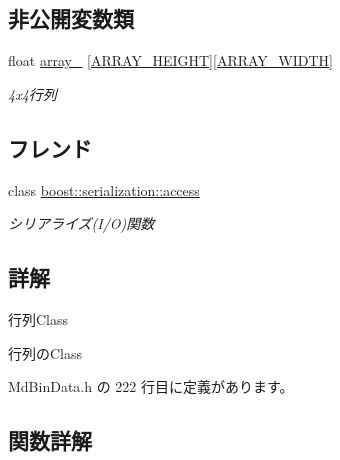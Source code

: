 \subsection*{非公開変数類}
\begin{DoxyCompactItemize}
\item 
float \mbox{\hyperlink{class_md_bin_data_1_1_matrix_a9b13d72966bb7b35e1c5acbfef92095f}{array\+\_\+}} \mbox{[}\mbox{\hyperlink{class_md_bin_data_1_1_matrix_a69ea4171a8c2fbf1728396463bfd9bc8}{A\+R\+R\+A\+Y\+\_\+\+H\+E\+I\+G\+HT}}\mbox{]}\mbox{[}\mbox{\hyperlink{class_md_bin_data_1_1_matrix_adbf2f2e21df64ab4559b9c98b88a6c59}{A\+R\+R\+A\+Y\+\_\+\+W\+I\+D\+TH}}\mbox{]}
\begin{DoxyCompactList}\small\item\em 4x4行列 \end{DoxyCompactList}\end{DoxyCompactItemize}
\subsection*{フレンド}
\begin{DoxyCompactItemize}
\item 
class \mbox{\hyperlink{class_md_bin_data_1_1_matrix_ac98d07dd8f7b70e16ccb9a01abf56b9c}{boost\+::serialization\+::access}}
\begin{DoxyCompactList}\small\item\em シリアライズ(I/O)関数 \end{DoxyCompactList}\end{DoxyCompactItemize}


\subsection{詳解}
行列\+Class 

行列の\+Class 

 Md\+Bin\+Data.\+h の 222 行目に定義があります。



\subsection{関数詳解}
\mbox{\label{class_md_bin_data_1_1_matrix_a18fdeb0e8152f5f8a8ba8e8d64c925bf}} 
